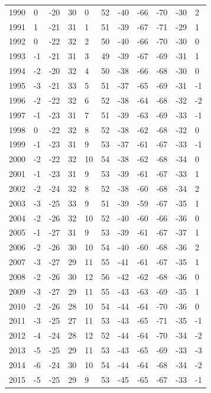 \begin{table}[H]
\begin{tabular}{lllllllllll}
1990 & 0 & -20 & 30 & 0 & 52 & -40 & -66 & -70 & -30 & 2 \\
1991 & 1 & -21 & 31 & 1 & 51 & -39 & -67 & -71 & -29 & 1 \\
1992 & 0 & -22 & 32 & 2 & 50 & -40 & -66 & -70 & -30 & 0 \\
1993 & -1 & -21 & 31 & 3 & 49 & -39 & -67 & -69 & -31 & 1 \\
1994 & -2 & -20 & 32 & 4 & 50 & -38 & -66 & -68 & -30 & 0 \\
1995 & -3 & -21 & 33 & 5 & 51 & -37 & -65 & -69 & -31 & -1 \\
1996 & -2 & -22 & 32 & 6 & 52 & -38 & -64 & -68 & -32 & -2 \\
1997 & -1 & -23 & 31 & 7 & 51 & -39 & -63 & -69 & -33 & -1 \\
1998 & 0 & -22 & 32 & 8 & 52 & -38 & -62 & -68 & -32 & 0 \\
1999 & -1 & -23 & 31 & 9 & 53 & -37 & -61 & -67 & -33 & -1 \\
2000 & -2 & -22 & 32 & 10 & 54 & -38 & -62 & -68 & -34 & 0 \\
2001 & -1 & -23 & 31 & 9 & 53 & -39 & -61 & -67 & -33 & 1 \\
2002 & -2 & -24 & 32 & 8 & 52 & -38 & -60 & -68 & -34 & 2 \\
2003 & -3 & -25 & 33 & 9 & 51 & -39 & -59 & -67 & -35 & 1 \\
2004 & -2 & -26 & 32 & 10 & 52 & -40 & -60 & -66 & -36 & 0 \\
2005 & -1 & -27 & 31 & 9 & 53 & -39 & -61 & -67 & -37 & 1 \\
2006 & -2 & -26 & 30 & 10 & 54 & -40 & -60 & -68 & -36 & 2 \\
2007 & -3 & -27 & 29 & 11 & 55 & -41 & -61 & -67 & -35 & 1 \\
2008 & -2 & -26 & 30 & 12 & 56 & -42 & -62 & -68 & -36 & 0 \\
2009 & -3 & -27 & 29 & 11 & 55 & -43 & -63 & -69 & -35 & 1 \\
2010 & -2 & -26 & 28 & 10 & 54 & -44 & -64 & -70 & -36 & 0 \\
2011 & -3 & -25 & 27 & 11 & 53 & -43 & -65 & -71 & -35 & -1 \\
2012 & -4 & -24 & 28 & 12 & 52 & -44 & -64 & -70 & -34 & -2 \\
2013 & -5 & -25 & 29 & 11 & 53 & -43 & -65 & -69 & -33 & -3 \\
2014 & -6 & -24 & 30 & 10 & 54 & -44 & -64 & -68 & -34 & -2 \\
2015 & -5 & -25 & 29 & 9 & 53 & -45 & -65 & -67 & -33 & -1 \\

\end{tabular}
\end{table}
